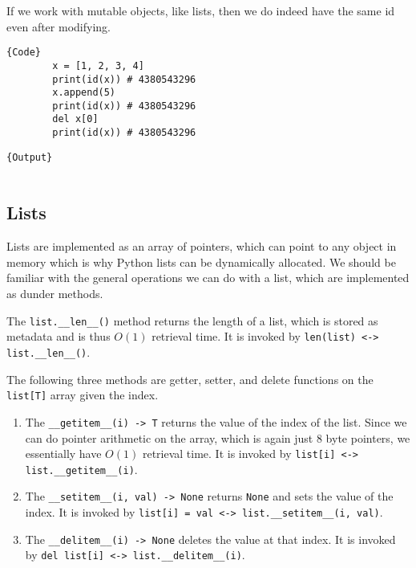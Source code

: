 \documentclass{article}
\begin{document}
      If we work with mutable objects, like lists, then we do indeed have the same id even after modifying. 

      \noindent\begin{minipage}{.5\textwidth}
      \begin{lstlisting}[]{Code}
        x = [1, 2, 3, 4] 
        print(id(x)) # 4380543296
        x.append(5) 
        print(id(x)) # 4380543296
        del x[0] 
        print(id(x)) # 4380543296
      \end{lstlisting}
      \end{minipage}
      \hfill
      \begin{minipage}{.49\textwidth}
      \begin{lstlisting}[]{Output}
        
      \end{lstlisting}
      \end{minipage}

  \subsection{Lists} 

    Lists are implemented as an array of pointers, which can point to any object in memory which is why Python lists can be dynamically allocated. We should be familiar with the general operations we can do with a list, which are implemented as dunder methods. 

    \begin{definition}[Length]
      The \texttt{list.\_\_len\_\_()} method returns the length of a list, which is stored as metadata and is thus $O(1)$ retrieval time. It is invoked by \texttt{len(list) <-> list.\_\_len\_\_()}. 
    \end{definition}

    \begin{definition}
      The following three methods are getter, setter, and delete functions on the \texttt{list[T]} array given the index. 
      \begin{enumerate}
        \item The \texttt{\_\_getitem\_\_(i) -> T} returns the value of the index of the list. Since we can do pointer arithmetic on the array, which is again just 8 byte pointers, we essentially have $O(1)$ retrieval time. It is invoked by \texttt{list[i] <-> list.\_\_getitem\_\_(i)}. 
        \item The \texttt{\_\_setitem\_\_(i, val) -> None} returns \texttt{None} and sets the value of the index. It is invoked by \texttt{list[i] = val <-> list.\_\_setitem\_\_(i, val)}. 
        \item The \texttt{\_\_delitem\_\_(i) -> None} deletes the value at that index. It is invoked by \texttt{del list[i] <-> list.\_\_delitem\_\_(i)}. 
      \end{enumerate}
    \end{definition}
  
\end{document}
